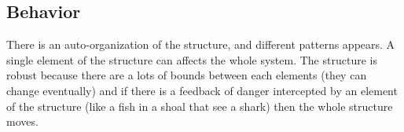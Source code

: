 \documentclass[twoside]{article}
\begin{document}
\subsection{Behavior}

There is an auto-organization of the structure, and different patterns appears.
A single element of the structure can affects the whole system.
The structure is robust because there are a lots of bounds between each elements (they can change eventually) and 
if there is a feedback of danger intercepted by an element of the structure (like a fish in a shoal that see a shark) then the whole structure moves.




\end{document}
